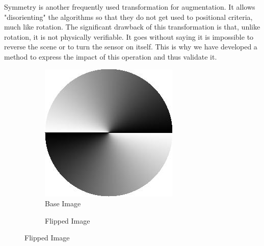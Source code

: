 Symmetry is another frequently used transformation for augmentation. It allows "disorienting" the algorithms so that they do not get used to positional criteria, much like rotation.
The significant drawback of this transformation is that, unlike rotation, it is not physically verifiable. It goes without saying it is impossible to reverse the scene or to turn the sensor on itself.
This is why we have developed a method to express the impact of this operation and thus validate it.

\begin{figure}[h]
	\centering
	\begin{subfigure}[b]{0.29\linewidth}
		\centering
		\caption*{\footnotesize Base Image}
		
		\includegraphics[width=\linewidth]{Figures/Aug/grad.jpg}
	\end{subfigure}
	\begin{subfigure}[b]{0.29\linewidth}  
		\centering 
		\caption*{\footnotesize Flipped Image}
		

\end{subfigure}
\end{figure}

